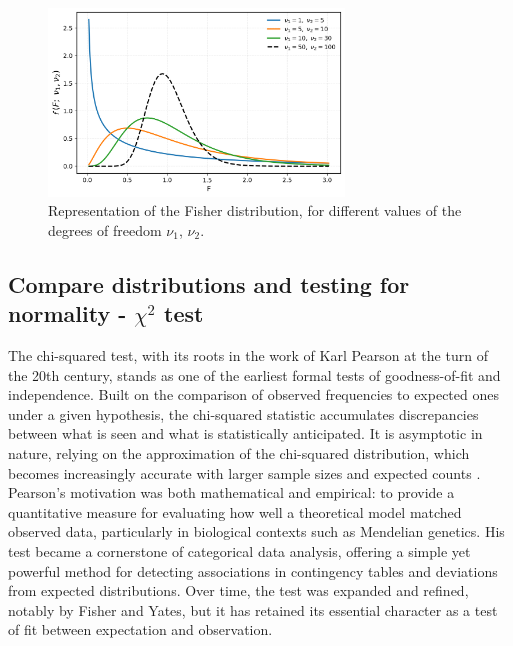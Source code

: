 \documentclass{book}
\begin{document}
\begin{figure}[ht]
    \centering
    \includegraphics[width=0.7\textwidth]{figures/chapter4/f_distribution.png}
    \caption{Representation of the Fisher distribution, for different values of the degrees of freedom $\nu_1$, $\nu_2$.}
    \label{fig:f_distribution}
\end{figure}

\newpage

\subsection{Compare distributions and testing for normality - $\chi^{2}$ test}

The chi-squared test, with its roots in the work of Karl Pearson at the turn of the 20th century, stands as one of the earliest formal tests of goodness-of-fit and independence. Built on the comparison of observed frequencies to expected ones under a given hypothesis, the chi-squared statistic accumulates discrepancies between what is seen and what is statistically anticipated. It is asymptotic in nature, relying on the approximation of the chi-squared distribution, which becomes increasingly accurate with larger sample sizes and expected counts \cite{pearson1900}.\\

Pearson’s motivation was both mathematical and empirical: to provide a quantitative measure for evaluating how well a theoretical model matched observed data, particularly in biological contexts such as Mendelian genetics. His test became a cornerstone of categorical data analysis, offering a simple yet powerful method for detecting associations in contingency tables and deviations from expected distributions. Over time, the test was expanded and refined, notably by Fisher and Yates, but it has retained its essential character as a test of fit between expectation and observation.\\
\end{document}
